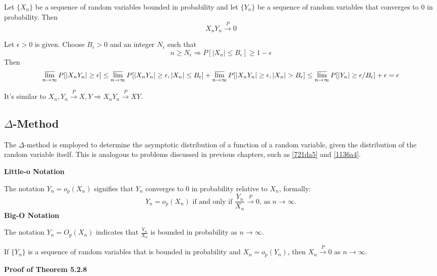 \begin{theorem}
Let $\{ X_n \}$ be a sequence of random variables bounded in probability and let $\{ Y_n \}$ be a sequence of random variables that converges to 0 in probability. Then
\[
X_nY_n\overset{ P }{ \to }0
\]
\end{theorem}
Let $\epsilon>0$ is given. Choose $B_{\epsilon}>0$ and an integer $N_{\epsilon}$ such that
\[
n\geq N_{\epsilon}\Rightarrow P[\lvert X_n \rvert \leq B_{\epsilon}]\geq 1-\epsilon
\]
Then
\[
\varlimsup_{ n \to \infty } P[\lvert X_nY_n \rvert \geq \epsilon]\leq \varlimsup_{ n \to \infty } P[\lvert X_nY_n \rvert \geq \epsilon,\lvert X_n \rvert \leq B_{\epsilon}]+\varlimsup_{ n \to \infty } P[\lvert X_nY_n \rvert \geq \epsilon,\lvert X_n \rvert >B_{\epsilon}]\leq \varlimsup_{ n \to \infty } P[\lvert Y_n \rvert \geq \epsilon/B_{\epsilon}]+\epsilon=\epsilon
\]
\begin{remark}
It's similar to $X_n,Y_n\overset{ P }{ \to }X,Y\Rightarrow X_nY_n\overset{ P }{ \to }XY$.
\end{remark}
\subsection{\texorpdfstring{$\Delta$}{Delta}-Method}

The $\Delta$-method is employed to determine the asymptotic distribution of a function of a random variable, given the distribution of the random variable itself. This is analogous to problems discussed in previous chapters, such as \cref{721da5} and \cref{1136a4}.

\textbf{Little-o Notation}

The notation $Y_n=o_p(X_n)$ signifies that $Y_n$ converges to 0 in probability relative to $X_n$, formally:
\[
Y_n=o_p(X_n) \text { if and only if } \frac{Y_n}{X_n} \xrightarrow{P} 0 \text {, as } n \rightarrow \infty.
\]
\textbf{Big-O Notation}

The notation $Y_n=O_p(X_n)$ indicates that $\frac{Y_n}{X_n}$ is bounded in probability as $n \rightarrow \infty$.

\begin{theorem}[Theorem 5.2.8.]
If $\{Y_n\}$ is a sequence of random variables that is bounded in probability and $X_n=o_p(Y_n)$, then $X_n \xrightarrow{P} 0$ as $n \rightarrow \infty$.\label{cf8d09}
\end{theorem}

\textbf{Proof of Theorem 5.2.8}

